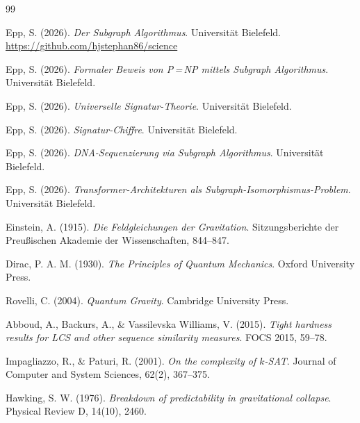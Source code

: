 ﻿\documentclass[a4paper,12pt]{article}
\theoremstyle{definition}
\begin{document}
\begin{thebibliography}{99}

Epp, S. (2026).
\textit{Der Subgraph Algorithmus}.
Universit\"at Bielefeld.
\url{https://github.com/hjstephan86/science}

Epp, S. (2026).
\textit{Formaler Beweis von P\,=\,NP mittels Subgraph Algorithmus}.
Universit\"at Bielefeld.

Epp, S. (2026).
\textit{Universelle Signatur-Theorie}.
Universit\"at Bielefeld.

Epp, S. (2026).
\textit{Signatur-Chiffre}.
Universit\"at Bielefeld.

Epp, S. (2026).
\textit{DNA-Sequenzierung via Subgraph Algorithmus}.
Universit\"at Bielefeld.

Epp, S. (2026).
\textit{Transformer-Architekturen als Subgraph-Isomorphismus-Problem}.
Universit\"at Bielefeld.

Einstein, A. (1915).
\textit{Die Feldgleichungen der Gravitation}.
Sitzungsberichte der Preu\ss{}ischen Akademie der Wissenschaften, 844--847.

Dirac, P. A. M. (1930).
\textit{The Principles of Quantum Mechanics}.
Oxford University Press.

Rovelli, C. (2004).
\textit{Quantum Gravity}.
Cambridge University Press.

Abboud, A., Backurs, A., \& Vassilevska Williams, V. (2015).
\textit{Tight hardness results for LCS and other sequence similarity measures}.
FOCS 2015, 59--78.

Impagliazzo, R., \& Paturi, R. (2001).
\textit{On the complexity of $k$-SAT}.
Journal of Computer and System Sciences, 62(2), 367--375.

Hawking, S. W. (1976).
\textit{Breakdown of predictability in gravitational collapse}.
Physical Review D, 14(10), 2460.


\end{thebibliography}
\end{document}
